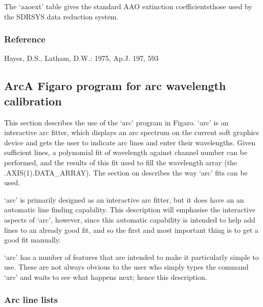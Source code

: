    The `aaoext' table gives the standard AAO extinction
   coefficients\latorhtm{---}{-}those used by the SDRSYS data
   reduction system.


\subsubsection{Reference}

Hayes, D.S., Latham, D.W.: 1975, Ap.J. 197, 593


\subsection{\label{techno10}Arc\latorhtm{---}{-}A
   Figaro program for arc wavelength calibration}

   This section describes the use of the `arc' program in Figaro.  
   `arc'
   is an interactive arc fitter, which displays an arc spectrum on the
   current soft graphics device and gets the user to indicate arc lines
   and enter their wavelengths.  Given sufficient lines, a polynomial
   fit of wavelength against channel number can be performed, and the
   results of this fit used to fill the wavelength array (the
   .AXIS(1).DATA\_ARRAY).
   {The section on }
   describes the way `arc' fits can be used.

   `arc' is primarily designed as an interactive arc fitter, but it does
   have an an automatic line finding capability.  This description will
   emphasise the interactive aspects of `arc', however, since this
   automatic capability is intended to help add lines to an already good
   fit, and so the first and most important thing is to get a good fit
   manually.

   `arc' has a number of features that are intended to make it
   particularly simple to use. These are not always obvious to the user
   who simply types the command `arc' and waits to see what happens
   next; hence this description.


\subsubsection{\label{techno10linelist}Arc line lists}

